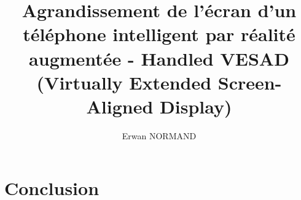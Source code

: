 \documentclass[letterpaper, twoside, 12pt,%
  memoire, francais, creativecommons, hyperref, withAlgo2e%
]{thETS}
\title{Agrandissement de l'écran d'un téléphone intelligent par réalité augmentée - Handled VESAD (Virtually Extended Screen-Aligned Display)}
\author{Erwan NORMAND}
\begin{document}

\maketitle
\presentjury

\begin{avantpropos}
  
\end{avantpropos}

\begin{remerciements}
  
\end{remerciements}



\tableofcontents
\listoftables
\listoffigures

\begin{listofabbr}[3cm]
  
\end{listofabbr}

\cleardoublepage
{}
\reversemarginpar
\setcounter{footnote}{0}

\begin{introduction}
  
\end{introduction}







\chapter*{Conclusion}
\label{ch:conclusion}


\appendix
\multiannexe



\newpage
\begin{spacing}{1}
  \nocite{*}
  
  
\end{spacing}
\end{document}
